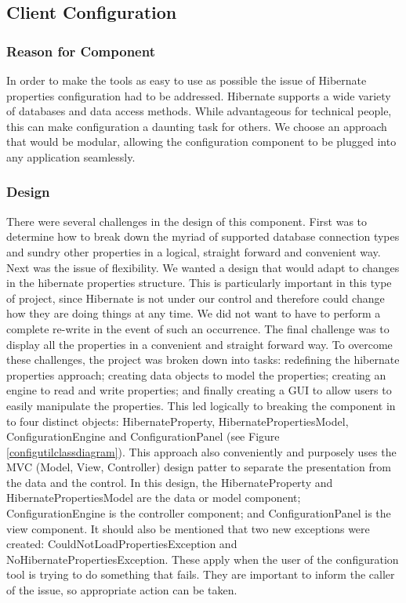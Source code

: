 \subsection{Client Configuration}

\subsubsection{Reason for Component}
In order to make the tools as easy to use as possible the issue of Hibernate properties configuration had to be addressed. Hibernate supports a wide variety of databases and data access methods. While advantageous for technical people, this can make configuration a daunting task for others. We choose an approach that would be modular, allowing the configuration component to be plugged into any application seamlessly.  


\subsubsection{Design}
There were several challenges in the design of this component. First was to determine how to break down the myriad of supported database connection types and sundry other properties in a logical, straight forward and convenient way. Next was the issue of flexibility. We wanted a design that would adapt to changes in the hibernate properties structure. This is particularly important in this type of project, since Hibernate is not under our control and therefore could change how they are doing things at any time. We did not want to have to perform a complete re-write in the event of such an occurrence. The final challenge was to display all the properties in a convenient and straight forward way. To overcome these challenges, the project was broken down into tasks: redefining the hibernate properties approach; creating data objects to model the properties; creating an engine to read and write properties; and finally creating a GUI to allow users to easily manipulate the properties. This led logically to breaking the component in to four distinct objects: HibernateProperty, HibernatePropertiesModel, ConfigurationEngine and ConfigurationPanel 
(see Figure \ref{configutilclassdiagram}). This approach also conveniently and purposely uses the MVC (Model, View, Controller) design patter to separate the presentation from the data and the control. In this design, the HibernateProperty and HibernatePropertiesModel are the data or model component; ConfigurationEngine is the controller component; and ConfigurationPanel is the view component. It should also be mentioned that two new exceptions were created: CouldNotLoadPropertiesException and NoHibernatePropertiesException. These apply when the user of the configuration tool is trying to do something that fails. They are important to inform the caller of the issue, so appropriate action can be taken.

